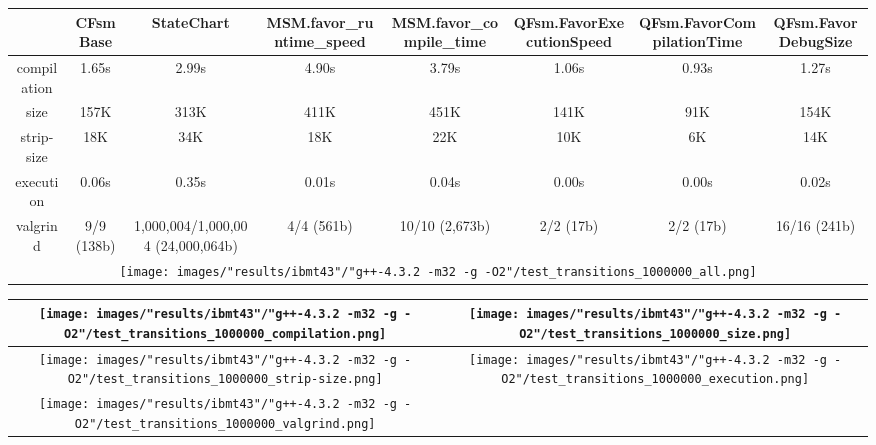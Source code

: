 \begin{landscape}
\begin{table}
\caption{"ibmt43" [df6407d], g++-4.3.2 -m32 -g -O2/test transitions 1000000}
\centering
\begin{longtable}{| c | c |c |c |c |c |c |c |}
\hline
& CFsmBase& StateChart& MSM.favor\_runtime\_speed& MSM.favor\_compile\_time& QFsm.FavorExecutionSpeed& QFsm.FavorCompilationTime& QFsm.FavorDebugSize\\
\hline
compilation & 1.65s & 2.99s & 4.90s & 3.79s & 1.06s & 0.93s & 1.27s\\
\hline
size & 157K & 313K & 411K & 451K & 141K & 91K & 154K\\
\hline
strip-size & 18K & 34K & 18K & 22K & 10K & 6K & 14K\\
\hline
execution & 0.06s & 0.35s & 0.01s & 0.04s & 0.00s & 0.00s & 0.02s\\
\hline
valgrind & 9/9 (138b) & 1,000,004/1,000,004 (24,000,064b) & 4/4 (561b) & 10/10 (2,673b) & 2/2 (17b) & 2/2 (17b) & 16/16 (241b)\\
\hline
\multicolumn{8}{|c|}{\texttt{[image: images/"results/ibmt43"/"g++-4.3.2 -m32 -g -O2"/test\_transitions\_1000000\_all.png]}}\\
\hline
\end{longtable}
\end{table}
\end{landscape}
\newpage
\begin{table}
\centering
\begin{longtable}{| c | c |}
\hline
\texttt{[image: images/"results/ibmt43"/"g++-4.3.2 -m32 -g -O2"/test\_transitions\_1000000\_compilation.png]}& \texttt{[image: images/"results/ibmt43"/"g++-4.3.2 -m32 -g -O2"/test\_transitions\_1000000\_size.png]}\\
\hline
\texttt{[image: images/"results/ibmt43"/"g++-4.3.2 -m32 -g -O2"/test\_transitions\_1000000\_strip-size.png]}& \texttt{[image: images/"results/ibmt43"/"g++-4.3.2 -m32 -g -O2"/test\_transitions\_1000000\_execution.png]}\\
\hline
\texttt{[image: images/"results/ibmt43"/"g++-4.3.2 -m32 -g -O2"/test\_transitions\_1000000\_valgrind.png]}& \\ \hline
\end{longtable}
\end{table}
